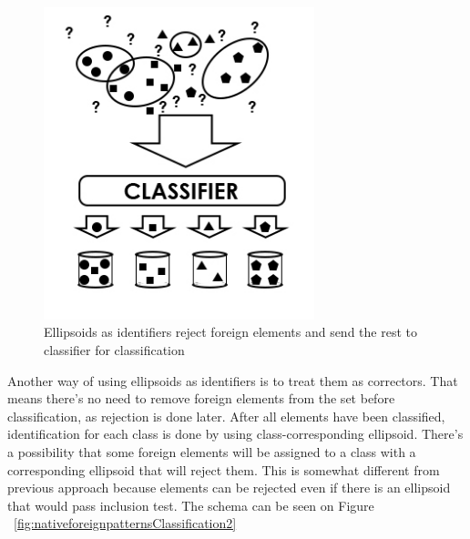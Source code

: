 \documentclass{llncs}
\begin{document}
\begin{figure}[!h]
  \centering
  \includegraphics[width=0.7\textwidth]{_Figures/Classification1.jpg}
  \caption{Ellipsoids as identifiers reject foreign elements and send the rest to classifier for classification}
\label{fig:nativeforeignpatternsClassification1}
\end{figure}

Another way of using ellipsoids as identifiers is to treat them as correctors. That means there's no need to remove foreign elements from the set before classification, as rejection is done later. After all elements have been classified, identification for each class is done by using class-corresponding ellipsoid. There's a possibility that some foreign elements will be assigned to a class with a corresponding ellipsoid that will reject them. This is somewhat different from previous approach because elements can be rejected even if there is an ellipsoid that would pass inclusion test. The schema can be seen on Figure ~\ref{fig:nativeforeignpatternsClassification2}
\end{document}
